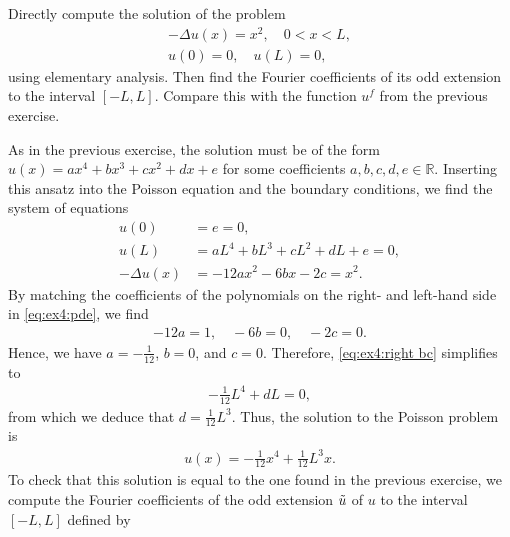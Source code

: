\documentclass[11pt]{article}
\begin{document}
\begin{exercise}
    Directly compute the solution of the problem
    \begin{gather*}
        - \Delta u(x) = x^2, \quad 0 < x < L,
        \\
        u(0) = 0, \quad u(L) = 0,
    \end{gather*}
    using elementary analysis. Then find the Fourier coefficients of its odd extension to the interval $[-L, L]$. Compare this with the function $u^f$ from the previous exercise.
\end{exercise}
\begin{solution}
    As in the previous exercise, the solution must be of the form $u(x) = ax^4 + bx^3 + cx^2 + dx + e$ for some coefficients $a,b,c,d,e \in \mathbb R$.
    Inserting this ansatz into the Poisson equation and the boundary conditions, we find the system of equations
    \begin{align}
        u(0) &= e = 0, \label{eq:ex4:left bc}\\
        u(L) &= a L^4 + b L^3 + c L^2 + d L + e = 0, \label{eq:ex4:right bc}\\
        - \Delta u(x) &= - 12 a x^2 - 6 b x - 2 c = x^2. \label{eq:ex4:pde}
    \end{align}
    By matching the coefficients of the polynomials on the right- and left-hand side in \eqref{eq:ex4:pde}, we find
    \begin{align*}
        - 12 a = 1, \quad - 6 b = 0, \quad - 2 c = 0.
    \end{align*}
    Hence, we have $a = -\frac{1}{12}$, $b = 0$, and $c = 0$. Therefore, \eqref{eq:ex4:right bc} simplifies to
    \begin{align*}
        -\frac{1}{12} L^4 + dL = 0,
    \end{align*}
    from which we deduce that $d = \frac{1}{12} L^3$. Thus, the solution to the Poisson problem is
    \begin{align*}
        u(x) = -\frac{1}{12} x^4 + \frac{1}{12} L^3 x.
    \end{align*}
    To check that this solution is equal to the one found in the previous exercise, 
    we compute the Fourier coefficients of the odd extension $\Tilde u$ of $u$ to the interval $[-L,L]$ defined by
    \begin{align*}

\end{align*}
\end{solution}
\end{document}

